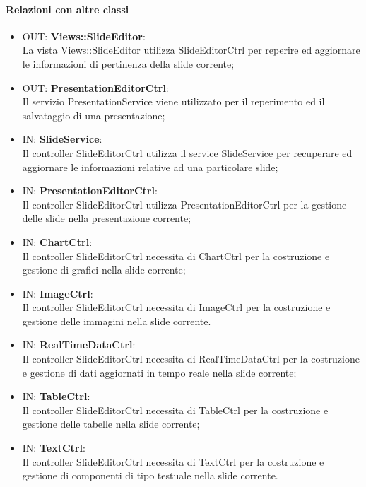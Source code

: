 	\paragraph{Relazioni con altre classi}
	\begin{itemize}
	  \item OUT: \textbf{Views::SlideEditor}:\\
		La vista Views::SlideEditor utilizza SlideEditorCtrl per reperire ed aggiornare le informazioni di pertinenza della slide corrente;	
	  \item OUT: \textbf{PresentationEditorCtrl}: \\
		 Il servizio PresentationService viene utilizzato per il reperimento ed il salvataggio di una presentazione;
	  \item IN: \textbf{SlideService}:\\
		Il controller SlideEditorCtrl utilizza il service SlideService per recuperare ed aggiornare le informazioni relative ad una particolare slide;	
	  \item IN: \textbf{PresentationEditorCtrl}:\\
		Il controller SlideEditorCtrl utilizza  PresentationEditorCtrl per la gestione delle slide nella presentazione corrente;
		
	\item IN: \textbf{ChartCtrl}:\\
		Il controller SlideEditorCtrl necessita di ChartCtrl per la costruzione e gestione di grafici nella slide corrente;
	\item IN: \textbf{ImageCtrl}:\\
		Il controller SlideEditorCtrl necessita di ImageCtrl per la costruzione e gestione delle immagini nella slide corrente.
	\item IN: \textbf{RealTimeDataCtrl}:\\
		Il controller SlideEditorCtrl necessita di RealTimeDataCtrl per la costruzione e gestione di dati aggiornati in tempo reale nella slide corrente;
	\item IN: \textbf{TableCtrl}:\\
		Il controller SlideEditorCtrl necessita di TableCtrl per la costruzione e gestione delle tabelle nella slide corrente;
	\item IN: \textbf{TextCtrl}:\\
		Il controller SlideEditorCtrl necessita di TextCtrl per la costruzione e gestione di componenti di tipo testuale nella slide corrente.
	\end{itemize}	
	
